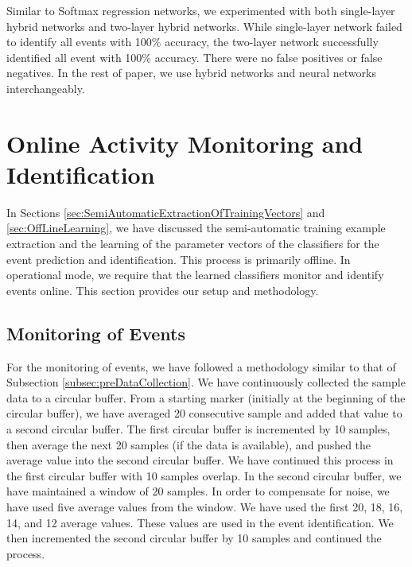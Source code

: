 \documentclass[]{IEEEtran}
\begin{document}
Similar to Softmax regression networks, we experimented  with both single-layer hybrid networks and two-layer hybrid networks. While single-layer network failed to identify all events with 100\% accuracy, the two-layer network successfully identified all event with 100\% accuracy. There were no false positives or false negatives. In the rest of paper, we use hybrid networks and neural networks interchangeably.

\section{Online Activity Monitoring and Identification}

In Sections \ref{sec:SemiAutomaticExtractionOfTrainingVectors} and 
\ref{sec:OffLineLearning}, we have discussed the semi-automatic training example 
extraction and the learning of the parameter vectors of the classifiers for the event 
prediction and identification. This process is primarily offline. In operational mode, we 
require that the learned classifiers monitor and identify events online. This section 
provides our setup and methodology.  



\subsection{Monitoring of Events}

For the monitoring of events, we have followed a methodology similar to that of 
Subsection \ref{subsec:preDataCollection}. We have continuously collected the sample data 
to a circular buffer. From a starting marker (initially at the beginning of the circular buffer), 
we have averaged 20 consecutive sample and added that value to a second circular buffer. The 
first circular buffer is incremented by 10 samples, then average the next 20 samples (if the 
data 
is available), and pushed  the average value into the second circular buffer. We have 
continued this process in 
the first circular buffer with 10 samples overlap. In the second circular buffer, we have 
maintained a window of 20 samples. 
In order to compensate for noise, we have used five average values from the window. We 
have 
used the first 20, 18, 16, 14, and 12 average values. These  values are used in the event 
identification. We then incremented the second circular buffer by 10 samples and continued 
the process.  
\end{document}
